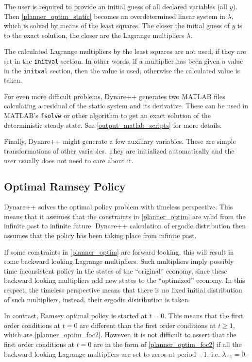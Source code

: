 \documentclass[10pt]{article}
\begin{document}
The user is required to provide an initial guess of all declared
variables (all $y$). Then \eqref{planner_optim_static} becomes an
overdetermined linear system in $\lambda$, which is solved by means of
the least squares. The closer the initial guess of $y$ is to the exact
solution, the closer are the Lagrange multipliers $\lambda$.

The calculated Lagrange multipliers by the least squares are not used,
if they are set in the {\tt initval} section. In other words, if a
multiplier has been given a value in the {\tt initval} section, then
the value is used, otherwise the calculated value is taken.

For even more difficult problems, Dynare++ generates two MATLAB files
calculating a residual of the static system and its derivative. These
can be used in MATLAB's {\tt fsolve} or other algorithm to get an
exact solution of the deterministic steady state. See
\ref{output_matlab_scripts} for more details.

Finally, Dynare++ might generate a few auxiliary variables. These are
simple transformations of other variables. They are initialized
automatically and the user usually does not need to care about it.

\subsection{Optimal Ramsey Policy}
\label{ramsey}

Dynare++ solves the optimal policy problem with timeless
perspective. This means that it assumes that the constraints in
\eqref{planner_optim} are valid from the infinite past to infinite
future. Dynare++ calculation of ergodic distribution then assumes that
the policy has been taking place from infinite past.

If some constraints in \eqref{planner_optim} are forward looking, this
will result in some backward looking Lagrange multipliers. Such
multipliers imply possibly time inconsistent policy in the states of
the ``original'' economy, since these backward looking multipliers add
new states to the ``optimized'' economy. In this respect, the timeless
perspective means that there is no fixed initial distribution of such
multipliers, instead, their ergodic distribution is taken.

In contrast, Ramsey optimal policy is started at $t=0$. This means
that the first order conditions at $t=0$ are different than the first
order conditions at $t\geq 1$, which are
\eqref{planner_optim_foc2}. However, it is not difficult to assert
that the first order conditions at $t=0$ are in the form of
\eqref{planner_optim_foc2} if all the backward looking Lagrange
multipliers are set to zeros at period $-1$, i.e. $\lambda_{-1}=0$.
\end{document}
